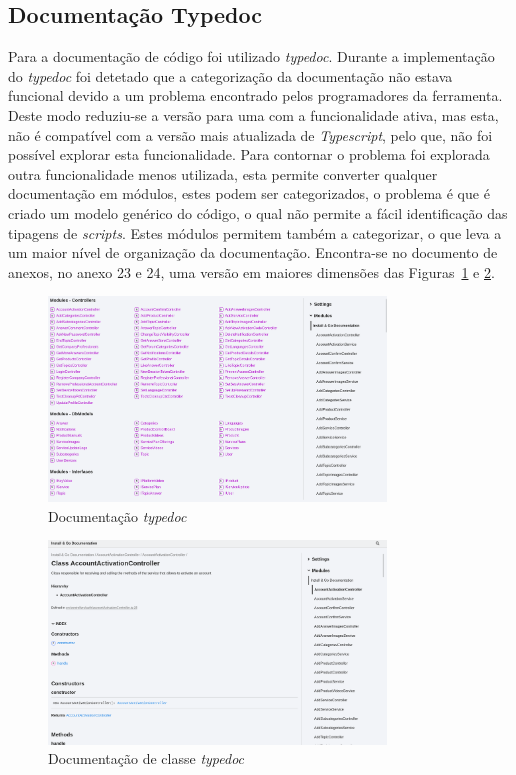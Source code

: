 \subsection{Documentação Typedoc}
Para a documentação de código foi utilizado \textit{typedoc}. Durante a implementação do \textit{typedoc} foi detetado que a categorização da documentação não estava funcional devido a um problema encontrado pelos programadores da ferramenta. Deste modo reduziu-se a versão para uma com a funcionalidade ativa, mas esta, não é compatível com a versão mais atualizada de \textit{Typescript}, pelo que, não foi possível explorar esta funcionalidade. Para contornar o problema foi explorada outra funcionalidade menos utilizada, esta permite converter qualquer documentação em módulos, estes podem ser categorizados, o problema é que é criado um modelo genérico do código, o qual não permite a fácil identificação das tipagens de \textit{scripts}. Estes módulos permitem também a categorizar, o que leva a um maior nível de organização da documentação.
Encontra-se no documento de anexos, no anexo 23 e 24, uma versão em maiores dimensões das Figuras~\ref*{type_doc} e \ref*{type_doc_det}.

\begin{figure}[htb]
 \centering
 \includegraphics[width=0.8\textwidth]{images/implementacao/api/docs.png}
 \caption{Documentação \textit{typedoc}}
 \label{type_doc}
\end{figure}

\begin{figure}[htb]
 \centering
 \includegraphics[width=0.8\textwidth]{images/implementacao/api/docs_det.png}
 \caption{Documentação de classe \textit{typedoc}}
 \label{type_doc_det}
\end{figure}

